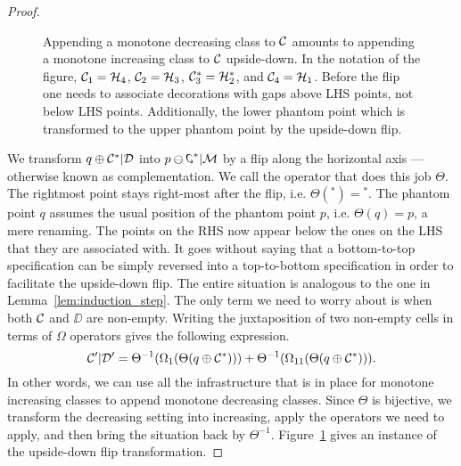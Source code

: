 \documentclass[12pt, a4paper, twoside]{report}
\begin{document}
\begin{proof}
\begin{figure}[!ht]
\caption{Appending a monotone decreasing class to $\mathcal{C}$ amounts to appending a monotone increasing class to $\mathcal{C}$ upside-down. In the notation of the figure, $\mathcal{C}_1= \mathcal{H}_4$, $\mathcal{C}_2 =\mathcal{H}_3$, $\mathcal{C}^*_3 = \mathcal{H}^*_2$, and $\mathcal{C}_4 = \mathcal{H}_1$. Before the flip one needs to associate decorations with gaps above LHS points, not below LHS points. Additionally, the lower phantom point which is transformed to the upper phantom point by the upside-down flip.}
\label{fig:horizontal_flip}
\end{figure}

We transform $q\oplus\mathcal{C}^*|\mathcal{D}$ into $p\ominus\reflectbox{\rotatebox[origin=c]{180}{\C}}^*|\M$ by a flip along the horizontal axis --- otherwise known as complementation. We call the operator that does this job $\Theta$. The rightmost point stays right-most after the flip, i.e. $\Theta({}^*) = {}^*$. The phantom point $q$ assumes the usual position of the phantom point $p$, i.e. $\Theta(q) = p$, a mere renaming. The points on the RHS now appear below the ones on the LHS that they are associated with. It goes without saying that a bottom-to-top specification can be simply reversed into a top-to-bottom specification in order to facilitate the upside-down flip. The entire situation is analogous to the one in Lemma~\ref{lem:induction_step}. The only term we need to worry about is when both $\mathcal{C}$ and $\DD$ are non-empty. Writing the juxtaposition of two non-empty cells in terms of $\Omega$ operators gives the following expression.
$$\mathcal{C}'|\mathcal{D}' = \Theta^{-1}(\Omega_1(\Theta(q\oplus \mathcal{C}^*))) + \Theta^{-1}(\Omega_{11}(\Theta(q \oplus \mathcal{C}^*))).$$ 
In other words, we can use all the infrastructure that is in place for monotone increasing classes to append monotone decreasing classes. Since $\Theta$ is bijective, we transform the decreasing setting into increasing, apply the operators we need to apply, and then bring the situation back by $\Theta^{-1}$. Figure~\ref{fig:horizontal_flip} gives an instance of the upside-down flip transformation.
\end{proof}
\end{document}
